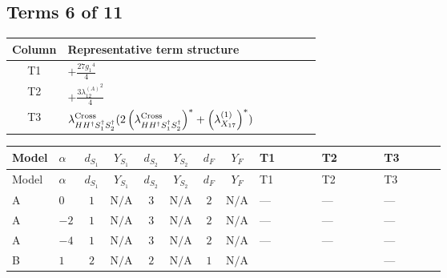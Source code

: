 \documentclass[8pt]{article}
\begin{document}
\begin{landscape}
\subsection*{Terms 6 of 11}
\begin{center}
\begin{tabular}{@{}c >{\raggedright\arraybackslash}p{0.82\linewidth}@{}}
\toprule
Column & Representative term structure \\
\midrule
T1 & \(\displaystyle +\frac{27 {g_1}^4}{4}\) \\
\midrule
T2 & \(\displaystyle +\frac{3 {\lambda_{12}^{(A)}}^2}{4}\) \\
\midrule
T3 & \(\displaystyle {\lambda_{H H^\dagger S_1^\dagger S_2^\dagger}^{\rm Cross}} (2 \left({\lambda_{H H^\dagger S_1^\dagger S_2^\dagger}^{\rm Cross}}\right)^{*}+\left({\lambda_{X_{17}}^{(1)}}\right)^{*})\) \\
\midrule
\bottomrule
\end{tabular}
\end{center}
\smallskip
\tiny
\begin{longtable}{@{}llcccccc >{\raggedright\arraybackslash}p{0.21\linewidth} >{\raggedright\arraybackslash}p{0.21\linewidth} >{\raggedright\arraybackslash}p{0.21\linewidth}@{}}
\toprule
Model & $\alpha$ & $d_{S_1}$ & $Y_{S_1}$ & $d_{S_2}$ & $Y_{S_2}$ & $d_F$ & $Y_F$ & T1 & T2 & T3 \\
\midrule
\endfirsthead
\toprule
Model & $\alpha$ & $d_{S_1}$ & $Y_{S_1}$ & $d_{S_2}$ & $Y_{S_2}$ & $d_F$ & $Y_F$ & T1 & T2 & T3 \\
\midrule
\endhead
A & $0$ & $1$ & $\text{N/A}$ & $3$ & $\text{N/A}$ & $2$ & $\text{N/A}$ & --- & --- & --- \\
\midrule
A & $-2$ & $1$ & $\text{N/A}$ & $3$ & $\text{N/A}$ & $2$ & $\text{N/A}$ & --- & --- & --- \\
\midrule
A & $-4$ & $1$ & $\text{N/A}$ & $3$ & $\text{N/A}$ & $2$ & $\text{N/A}$ & --- & --- & --- \\
\midrule
B & $1$ & $2$ & $\text{N/A}$ & $2$ & $\text{N/A}$ & $1$ & $\text{N/A}$ & \scriptsize\adjustbox{max width=\linewidth}{$\begin{gathered} +\frac{27 {g_1}^4}{4}\end{gathered}$} & \scriptsize\adjustbox{max width=\linewidth}{$\begin{gathered} +\frac{3 {\lambda_{12}^{(A)}}^2}{4}\end{gathered}$} & --- \\
\midrule

\end{longtable}
\end{landscape}
\end{document}
